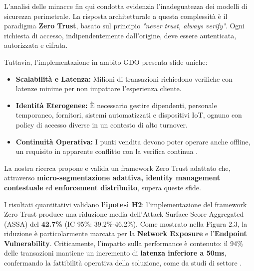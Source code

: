 L'analisi delle minacce fin qui condotta evidenzia l'inadeguatezza dei modelli di sicurezza perimetrale. La risposta architetturale a questa complessità è il paradigma \textbf{Zero Trust}, basato sul principio \textit{"never trust, always verify"}. Ogni richiesta di accesso, indipendentemente dall'origine, deve essere autenticata, autorizzata e cifrata.

Tuttavia, l'implementazione in ambito GDO presenta sfide uniche:

    \begin{itemize}
        \item \textbf{Scalabilità e Latenza:} Milioni di transazioni richiedono verifiche con latenze minime per non impattare l'esperienza cliente.\autocite{paloalto2024}
       
        \item \textbf{Identità Eterogenee: }È necessario gestire dipendenti, personale temporaneo, fornitori, sistemi automatizzati e dispositivi IoT, ognuno con policy di accesso diverse in un contesto di alto turnover. \autocite{nrf2024}
        
        \item \textbf{Continuità Operativa:} I punti vendita devono poter operare anche offline, un requisito in apparente conflitto con la verifica continua .
    \end{itemize}

La nostra ricerca propone e valida un framework Zero Trust adattato che, attraverso \textbf{micro-segmentazione adattiva, identity management contestuale} ed \textbf{enforcement distribuito}, supera queste sfide.

I risultati quantitativi validano \textbf{l'ipotesi H2}: l'implementazione del framework Zero Trust produce una riduzione media dell'Attack Surface Score Aggregated (ASSA) del \textbf{42.7\%} (IC 95\%: 39.2\%-46.2\%). Come mostrato nella Figura 2.3, la riduzione è particolarmente marcata per la \textbf{Network Exposure} e l'\textbf{Endpoint Vulnerability}. Criticamente, l'impatto sulla performance è contenuto: il 94\% delle transazioni mantiene un incremento di \textbf{latenza inferiore a 50ms}, confermando la fattibilità operativa della soluzione, come da studi di settore \autocite{paloalto2024}.


